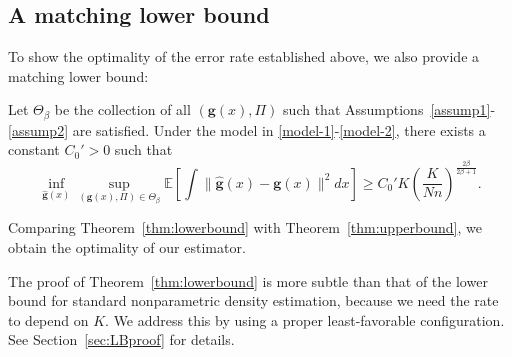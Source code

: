 \documentclass[preprint,11pt]{article}
\def\r#1{\textcolor{red}{\bf #1}}
\newcommand{\mbb}{\mathbb}
\newcommand{\mcal}{\mathcal}
\numberwithin{equation}{section}
\begin{document}








\subsection{A matching lower bound} \label{subsec:LB}
To show the optimality of the error rate established above, we also provide a matching lower bound:
\begin{thm}\label{thm:lowerbound}
Let $\Theta_{\beta}$ be the collection of all $({\boldsymbol g}(x), \Pi)$ such that Assumptions~\ref{assump1}-\ref{assump2} are satisfied. 
    Under the model in \eqref{model-1}-\eqref{model-2}, there exists a constant $C_0'>0$ such that
    \[
        \inf_{\widehat{\bm{g}}(x)}\sup_{(\bm{g}(x), \Pi)\in\Theta_\beta}\mbb{E}\left[\int \|\widehat{\bm{g}}(x)- \bm{g}(x)\|^2dx\right]\ge C_0'K\left(\frac{K}{N n}\right)^{\frac{2\beta}{2\beta+1}}.
\]
\end{thm}

Comparing Theorem~\ref{thm:lowerbound} with Theorem~\ref{thm:upperbound}, we obtain the optimality of our estimator. 

The proof of Theorem~\ref{thm:lowerbound} is more subtle than that of the lower bound for standard nonparametric density estimation, because we need the rate to depend on $K$. We address this by using a proper least-favorable configuration. See Section~\ref{sec:LBproof} for details.  
\end{document}
